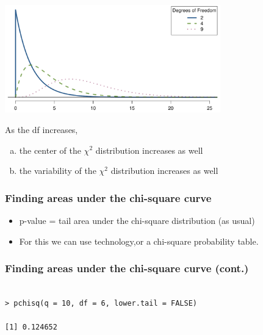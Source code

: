 \begin{frame}
\frametitle{}


\begin{center}
\includegraphics[width=0.7\textwidth]{6-3_chisq_gof/figures/chiSquareDistributionWithInceasingDF/chiSquareDistributionWithInceasingDF}
\end{center}

As the df increases,
\begin{enumerate}[(a)]
\item the center of the $\chi^2$ distribution increases as well
\item the variability of the $\chi^2$ distribution increases as well
\end{enumerate}

\end{frame}


\begin{frame}[fragile]
\frametitle{Finding areas under the chi-square curve}

\begin{itemize}

\item p-value = tail area under the chi-square distribution (as usual)

\pause

\item For this we can use technology,or a chi-square probability table.

\end{itemize}

\end{frame}


\begin{frame}[fragile]
\frametitle{Finding areas under the chi-square curve (cont.)}


\pause

\begin{verbatim}

> pchisq(q = 10, df = 6, lower.tail = FALSE)

[1] 0.124652

\end{verbatim}

\end{frame}


